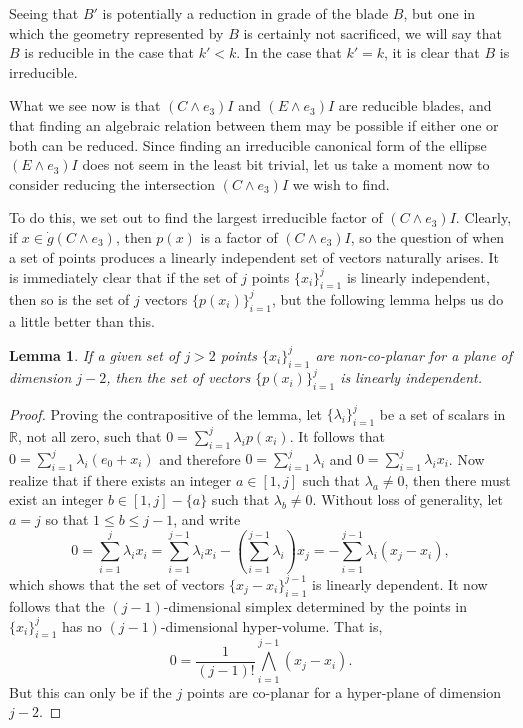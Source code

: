 \documentclass{birkjour}
\newtheorem{lem}[thm]{Lemma}
\theoremstyle{definition}
\theoremstyle{remark}
\numberwithin{equation}{section}
\newcommand{\R}{\mathbb{R}}
\newcommand{\gd}{\dot{g}}
\begin{document}
Seeing that $B'$ is potentially a reduction in grade of the blade $B$, but one
in which the geometry represented by $B$ is certainly not sacrificed,
we will say that $B$ is reducible
in the case that $k'<k$.  In the case that $k'=k$, it is clear that $B$ is irreducible.

What we see now is that $(C\wedge e_3)I$ and $(E\wedge e_3)I$ are reducible blades,
and that finding an algebraic relation between them may be possible if either
one or both can be reduced.  Since finding an irreducible canonical form of the ellipse $(E\wedge e_3)I$
does not seem in the least bit trivial, let us take a moment now to consider reducing the
intersection $(C\wedge e_3)I$ we wish to find.

To do this, we set out to find the largest irreducible factor of $(C\wedge e_3)I$.
Clearly, if $x\in\gd(C\wedge e_3)$, then $p(x)$ is a factor of $(C\wedge e_3)I$, so
the question of when a set of points produces a linearly independent set of
vectors naturally arises.  It is immediately clear that if the set of $j$ points $\{x_i\}_{i=1}^j$
is linearly independent, then so is the set of $j$ vectors $\{p(x_i)\}_{i=1}^j$, but the following
lemma helps us do a little better than this.
\begin{lem}\label{lma_non_co_planar}
If a given set of $j>2$ points $\{x_i\}_{i=1}^j$ are non-co-planar for a plane of
dimension $j-2$, then the set of vectors $\{p(x_i)\}_{i=1}^j$ is linearly independent.
\end{lem}
\begin{proof}
Proving the contrapositive of the lemma, let $\{\lambda_i\}_{i=1}^j$ be
a set of scalars in $\R$, not all zero, such that $0=\sum_{i=1}^j\lambda_i p(x_i)$.
It follows that $0=\sum_{i=1}^j\lambda_i(e_0+x_i)$ and therefore
$0=\sum_{i=1}^j\lambda_i$ and $0=\sum_{i=1}^j\lambda_i x_i$.
Now realize that if there exists an integer $a\in[1,j]$ such that $\lambda_a\neq 0$,
then there must exist an integer $b\in[1,j]-\{a\}$ such that $\lambda_b\neq 0$.
Without loss of generality, let $a=j$ so that $1\leq b\leq j-1$, and write
\begin{equation*}
0 = \sum_{i=1}^j\lambda_ix_i = \sum_{i=1}^{j-1}\lambda_ix_i - \left(\sum_{i=1}^{j-1}\lambda_i\right)x_j = -\sum_{i=1}^{j-1}\lambda_i(x_j-x_i),
\end{equation*}
which shows that the set of vectors $\{x_j-x_i\}_{i=1}^{j-1}$ is linearly dependent.
It now follows that the $(j-1)$-dimensional simplex determined by the points in $\{x_i\}_{i=1}^j$
has no $(j-1)$-dimensional hyper-volume.  That is,
\begin{equation*}
0 = \frac{1}{(j-1)!}\bigwedge_{i=1}^{j-1}(x_j-x_i).
\end{equation*}
But this can only be if the $j$ points are co-planar for a hyper-plane of dimension $j-2$.
\end{proof}
\end{document}
